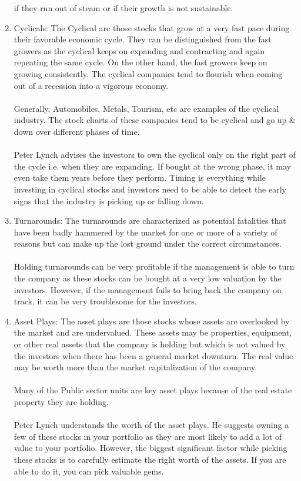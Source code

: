 \begin{enumerate}
        if they run out of steam or if their growth is not sustainable.
    \item Cyclicals: The Cyclical are those stocks that grow at a very fast pace 
        during their favorable economic cycle. They can be distinguished from the 
        fast growers as the cyclical keeps on expanding and contracting and again 
        repeating the same cycle. On the other hand, the fast growers keep on 
        growing consistently. The cyclical companies tend to flourish when coming 
        out of a recession into a vigorous economy.\\\\
        Generally, Automobiles, Metals, Tourism, etc are examples of the cyclical 
        industry. The stock charts of these companies tend to be cyclical and go 
        up \& down over different phases of time.\\\\
        Peter Lynch advises the investors to own the cyclical only on the right 
        part of the cycle i.e. when they are expanding. If bought at the wrong 
        phase, it may even take them years before they perform. Timing is 
        everything while investing in cyclical stocks and investors need to be 
        able to detect the early signs that the industry is picking up or falling 
        down.
    \item Turnarounds: The turnarounds are characterized as potential fatalities 
        that have been badly hammered by the market for one or more of a variety 
        of reasons but can make up the lost ground under the correct circumstances.\\\\
        Holding turnarounds can be very profitable if the management is able to 
        turn the company as these stocks can be bought at a very low valuation 
        by the investors. However, if the management fails to bring back the 
        company on track, it can be very troublesome for the investors.
    \item Asset Plays: The asset plays are those stocks whose assets are 
        overlooked by the market and are undervalued. These assets may be 
        properties, equipment, or other real assets that the company is holding 
        but which is not valued by the investors when there has been a general 
        market downturn. The real value may be worth more than the market 
        capitalization of the company.\\\\
        Many of the Public sector units are key asset plays because of the real 
        estate property they are holding.\\\\
        Peter Lynch understands the worth of the asset plays. He suggests owning 
        a few of these stocks in your portfolio as they are most likely to add a 
        lot of value to your portfolio. However, the biggest significant factor 
        while picking these stocks is to carefully estimate the right worth of 
        the assets. If you are able to do it, you can pick valuable gems.
\end{enumerate}

